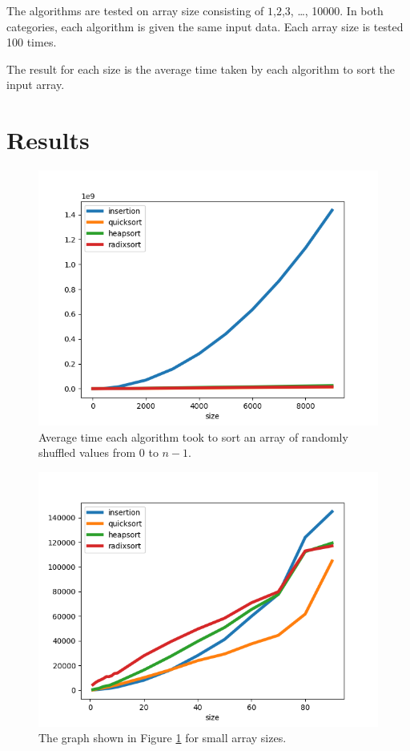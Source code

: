 \documentclass{article}
\begin{document}
The algorithms are tested on array size consisting of $1$,$2$,$3$, \dots, 10000.
In both categories, each algorithm is given the same input data.
Each array size is tested 100 times.

The result for each size is the average time taken by each algorithm to sort the input array.
\section{Results}

\begin{figure}[ht]
\centering
\includegraphics[width=0.8\linewidth,height=0.4\textheight]{plt1.png}
\caption{Average time each algorithm took to sort an array of randomly shuffled values from $0$ to $n - 1$.}
\label{avg}
\end{figure}

\begin{figure}[ht]
\centering
\includegraphics[width=0.8\linewidth,height=0.4\textheight]{plt5.png}
\caption{The graph shown in Figure \ref{avg} for small array sizes.}
\label{avg:small}
\end{figure}
\end{document}
